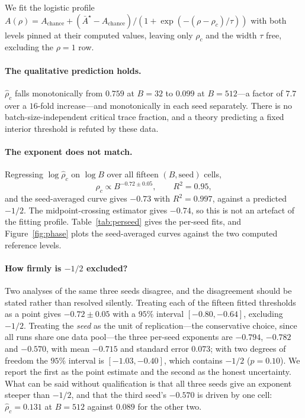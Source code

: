 \documentclass{article}
\theoremstyle{plain}
\theoremstyle{definition}
\theoremstyle{remark}
\newcommand{\1}{\mathbf{1}}
\begin{document}
We fit the logistic profile
$A(\rho) = A_{\mathrm{chance}} + (\bar A^\star-A_{\mathrm{chance}})/
(1+\exp(-(\rho-\rho_c)/\tau))$ with both levels pinned at their computed values,
leaving only $\rho_c$ and the width $\tau$ free, excluding the $\rho = 1$ row.

\paragraph{The qualitative prediction holds.}
$\hat\rho_c$ falls monotonically from $0.759$ at $B = 32$ to $0.099$ at
$B = 512$---a factor of $7.7$ over a $16$-fold increase---and monotonically in
each seed separately. There is no batch-size-independent critical trace fraction,
and a theory predicting a fixed interior threshold is refuted by these data.

\paragraph{The exponent does not match.}
Regressing $\log\hat\rho_c$ on $\log B$ over all fifteen $(B,\mathrm{seed})$
cells,
\begin{equation}
\label{eq:measured}
\hat\rho_c \propto B^{-0.72\pm0.05},\qquad R^2 = 0.95,
\end{equation}
and the seed-averaged curve gives $-0.73$ with $R^2 = 0.997$, against a predicted
$-1/2$. The midpoint-crossing estimator gives $-0.74$, so this is not an artefact
of the fitting profile. Table~\ref{tab:perseed} gives the per-seed fits, and
Figure~\ref{fig:phase} plots the seed-averaged curves against the two computed
reference levels.

\paragraph{How firmly is $-1/2$ excluded?}
Two analyses of the same three seeds disagree, and the disagreement should be
stated rather than resolved silently. Treating each of the fifteen fitted
thresholds as a point gives $-0.72\pm0.05$ with a $95\%$ interval
$[-0.80,-0.64]$, excluding $-1/2$. Treating the \emph{seed} as the unit of
replication---the conservative choice, since all runs share one data pool---the
three per-seed exponents are $-0.794$, $-0.782$ and $-0.570$, with mean $-0.715$
and standard error $0.073$; with two degrees of freedom the $95\%$ interval is
$[-1.03,-0.40]$, which contains $-1/2$ ($p = 0.10$). We report the first as the
point estimate and the second as the honest uncertainty. What can be said without
qualification is that all three seeds give an exponent steeper than $-1/2$, and
that the third seed's $-0.570$ is driven by one cell: $\hat\rho_c = 0.131$ at
$B = 512$ against $0.089$ for the other two.
\end{document}
